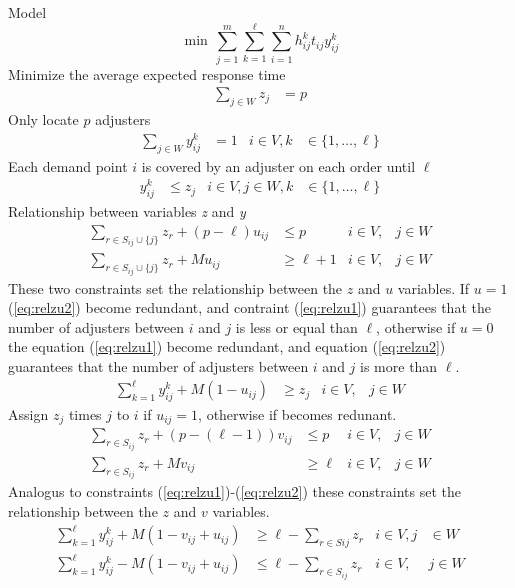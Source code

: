 Model
\begin{equation}
  \min \, \sum_{j=1}^{m}{
    \sum_{k=1}^{\ell}{
      \sum_{i=1}^{n}{
        h_{ij}^{k}t_{ij}y_{ij}^{k}
      }
    }
  }
\end{equation}
Minimize the average expected response time
\begin{align}
  \sum_{j \in W}{z_j}
  & = p
\end{align}
Only locate $p$ adjusters
\begin{align}
  \sum_{j \in W}{y_{ij}^{k}}
  & = 1
  & i \in V, k
  &\in \{1,\ldots,\ell\}
\end{align}
Each demand point $i$ is covered by an adjuster on each order until $\ell$
\begin{align}
  y_{ij}^{k}
  & \leq z_j
  & i \in V,j \in W, k
  &\in \{1,\ldots,\ell\}
\end{align}
Relationship between variables \textit{z} and \textit{y}
\begin{align}
  \label{eq:relzu1}
  \sum_{r \in S_{ij}\cup\{j\}}{
    z_{r}
  }
  + (p-\ell) u_{ij}
  & \leq p
  & i \in V,
  & j \in W 
  \\
  \label{eq:relzu2}
  \sum_{r \in S_{ij}\cup\{j\}}{
    z_{r}
  }
  + M u_{ij}
  & \geq \ell+1
  & i \in V,
  & j \in W
\end{align}
These two constraints
set the relationship
between the $z$ and $u$ variables.
If $u = 1$
(\ref{eq:relzu2}) become redundant,
and contraint (\ref{eq:relzu1}) guarantees
that the number of adjusters between $i$ and $j$
is less or equal than $\ell$,
otherwise
if $u = 0$
the equation (\ref{eq:relzu1}) become redundant,
and equation (\ref{eq:relzu2}) guarantees
that the number of adjusters between $i$ and $j$
is more than $\ell$.
\begin{align}
  \sum_{k = 1}^{\ell}{
    y_{ij}^{k}
  }
  + M (1 - u_{ij})
  & \geq z_j
  & i \in V,
  & j \in W
\end{align}
Assign $z_j$ times $j$ to $i$ if $u_{ij}=1$,
otherwise
if becomes redunant.
\begin{align}
  \sum_{r \in S_{ij}}{
    z_{r}
  }
  + (p-(\ell-1)) v_{ij}
  & \leq p
  & i \in V,
  & j \in W
  \\
  \sum_{r \in S_{ij}}{
    z_{r}
  }
  + M v_{ij}
  & \geq \ell
  & i \in V,
  & j \in W
\end{align}
Analogus to constraints (\ref{eq:relzu1})-(\ref{eq:relzu2})
these constraints
set the relationship
between the $z$ and $v$ variables.
\begin{align}
  \sum_{k=1}^{\ell}{
    y_{ij}^{k}
  }
  + M (1 - v_{ij} + u_{ij})
  & \geq \ell
  - \sum_{r \in S{ij}}{
    z_{r}
  } 
  &  i \in V, j 
  & \in W
  \\
  \sum_{k=1}^{\ell}{
    y_{ij}^{k}
  }
  - M (1 - v_{ij} + u_{ij})
  & \leq \ell 
  - \sum_{r \in S_{ij}}{
    z_{r}
  }
  & i \in V,
  & j \in W
\end{align}
